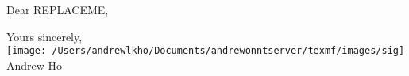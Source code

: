 \documentclass[a4paper,10pt]{article}
\begin{document}
\hfill
{}

\vspace{\baselineskip}

Dear REPLACEME,



\vspace{\baselineskip}
Yours sincerely, \\
\texttt{[image: /Users/andrewlkho/Documents/andrewonntserver/texmf/images/sig]} \\
Andrew Ho
\end{document}
